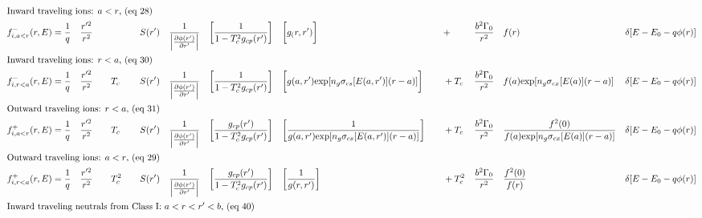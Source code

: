 \documentclass[a3]{book}
\begin{document}
\newpage

{\small
\begin{align}
	 \intertext{Inward traveling ions: $a < r$, (eq 28)}																																																																														
&	f_{i,a<r}^-(r, E)        = \frac{1}{q} 	&& \frac{r'^2}{r^2}		&& 	 					&& 			&& 			&& S(r')			&& \frac{1}{ \Big\vert \frac{ \partial \phi(r')}{ \partial r' } \Big\vert }	&& \bigg[ \frac{ 1}{ 1 - T_c^2 g_{cp}(r')} \bigg] 					&& \bigg[ g_(r, r') \bigg]														&&			&& + 		&& \frac{b^2 \Gamma_0 }{r^2 } 												&& f(r)																&& \delta[E - E_0 - q\phi(r)]			\\
	 \intertext{Inward traveling ions: $r < a$, (eq 30)}																																																																													
&	f_{i,r<a}^-(r, E)        = \frac{1}{q} 	&& \frac{r'^2}{r^2}		&& 	 					&&  T_c		&& 			&& S(r')			&& \frac{1}{ \Big\vert \frac{ \partial \phi(r')}{ \partial r' } \Big\vert } 	&& \bigg[ \frac{ 1}{ 1 - T_c^2 g_{cp}(r')} \bigg]	 				&& \bigg[ g(a,r') \text{exp}[n_g \sigma_{cs}[ E(a,r') ] (r -a )]	\bigg]			&& 			&& + T_c	&& \frac{b^2 \Gamma_0 }{r^2 } 												&& f(a) \text{exp}[n_g \sigma_{cx}[ E(a)] (r - a)]						&& \delta[E - E_0 - q\phi(r)] 			\\
%																																																																														
	\intertext{Outward traveling ions: $r < a$, (eq 31)}																																																																													
&	f_{i,a<r}^+(r, E)        = \frac{1}{q} 	&& \frac{r'^2}{r^2}		&& 	 					&& T_c		&& 			&& S(r')			&& \frac{1}{ \Big\vert \frac{ \partial \phi(r')}{ \partial r' } \Big\vert } 	&& \bigg[ \frac{ g_{cp}(r')}{ 1 - T_c^2 g_{cp}(r')} \bigg] 			&& \bigg[ \frac{1}{g(a,r') \text{exp}[n_g \sigma_{cs}[ E(a,r') ] (r -a )]} \bigg]	&&			&& + T_c	&& \frac{b^2 \Gamma_0  }{r^2 } 											&& \frac{f^2(0)}{f(a) \text{exp}[n_g \sigma_{cx}[ E(a)] (r - a)]}		&& \delta[E - E_0 - q\phi(r)] 			\\
 	\intertext{Outward traveling ions: $a < r$, (eq 29)}	
& 	f_{i,r<a}^+(r, E)        = \frac{1}{q} 	&& \frac{r'^2}{r^2}		&& 	 					&& T_c^2	&& 			&& S(r')			&& \frac{1}{ \Big\vert \frac{ \partial \phi(r')}{ \partial r' } \Big\vert } 	&& \bigg[ \frac{ g_{cp}(r')}{ 1 - T_c^2 g_{cp}(r')} \bigg] 			&& \bigg[ \frac{1}{g(r,r')} \bigg]												&& 			&& + T_c^2	&& \frac{b^2 \Gamma_0  }{r^2 }												&& \frac{f^2(0)}{f(r)}												&& \delta[E - E_0 - q\phi(r)]			\\
% 
	\intertext{Inward traveling neutrals from Class I: $a < r < r' < b$, (eq 40)} 																																																																														

\end{align}}
\end{document}
